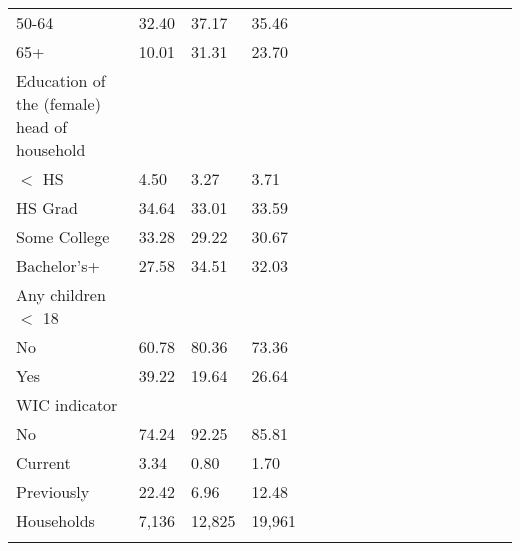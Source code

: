 \begin{table}
\begin{center}
\begin{tabularx} {14cm} {@{} l Y Y Y Y Y Y Y Y Y Y Y Y Y Y Y Y@{}}
50-64&32.40&37.17&35.46 \\
65+&10.01&31.31&23.70 \\
\midrule
Education of the (female) head of household&&& \\
$<$ HS&4.50&3.27&3.71 \\
HS Grad&34.64&33.01&33.59 \\
Some College&33.28&29.22&30.67 \\
Bachelor's+&27.58&34.51&32.03 \\
\midrule
Any children $<$ 18&&& \\
No&60.78&80.36&73.36 \\
Yes&39.22&19.64&26.64 \\
\midrule
WIC indicator&&& \\
No&74.24&92.25&85.81 \\
Current&3.34&0.80&1.70 \\
Previously&22.42&6.96&12.48 \\
\midrule
Households &7,136&12,825&19,961 \\
\bottomrule
\addlinespace[.75ex]
\end{tabularx}
\par
\scriptsize{}
\normalsize
\end{center}
\end{table}